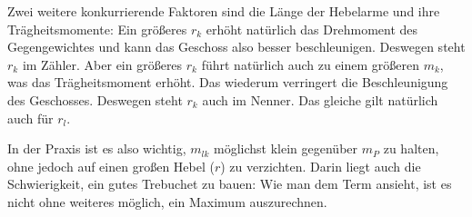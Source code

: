 Zwei weitere konkurrierende Faktoren sind die Länge der Hebelarme und ihre Trägheitsmomente: Ein größeres $r_k$ erhöht natürlich das Drehmoment des Gegengewichtes und kann das Geschoss also besser beschleunigen. Deswegen steht $r_k$ im Zähler. Aber ein größeres $r_k$ führt natürlich auch zu einem größeren $m_k$, was das Trägheitsmoment erhöht. Das wiederum verringert die Beschleunigung des Geschosses. Deswegen steht $r_k$ auch im Nenner. Das gleiche gilt natürlich auch für $r_l$.

In der Praxis ist es also wichtig, $m_{lk}$ möglichst klein gegenüber $m_P$ zu halten, ohne jedoch auf einen großen Hebel ($r$) zu verzichten. Darin liegt auch die Schwierigkeit, ein gutes Trebuchet zu bauen: Wie man dem Term ansieht, ist es nicht ohne weiteres möglich, ein Maximum auszurechnen.